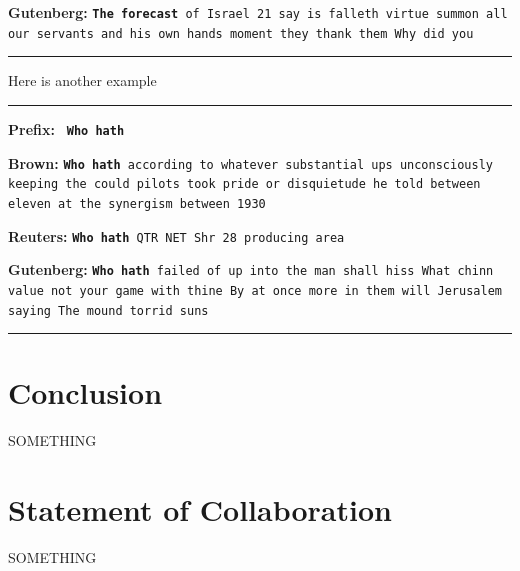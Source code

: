 \documentclass[11pt,a4paper]{article}
\begin{document}
\textbf{Gutenberg:} \texttt{\textbf{The forecast} of Israel 21 say is falleth virtue summon all our servants and his own hands moment they thank them Why did you}

\rule{0.49\textwidth}{0.4pt}


Here is another example

\rule{0.49\textwidth}{0.4pt}
\textbf{Prefix:} \texttt{ \textbf{Who hath} }
\vspace{1mm}

\textbf{Brown:} \texttt{\textbf{Who hath} according to whatever substantial ups unconsciously keeping the could pilots took pride or disquietude he told between eleven at the synergism between 1930}
\vspace{1mm}

\textbf{Reuters:}  \texttt{\textbf{Who hath} QTR NET Shr 28 producing area}
\vspace{1mm}

\textbf{Gutenberg:} \texttt{\textbf{Who hath} failed of up into the man shall hiss What chinn value not your game with thine By at once more in them will Jerusalem saying The mound torrid suns}

\rule{0.49\textwidth}{0.4pt}



\section{Conclusion}%
\label{sec:conclusion}

SOMETHING




\section{Statement of Collaboration}
SOMETHING





\end{document}
